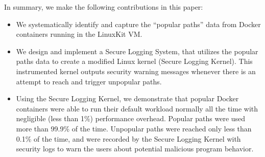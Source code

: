 In summary, we make the following contributions in this paper: 
\begin{itemize}
	\item We systematically identify and capture the ``popular paths'' data from Docker containers running in the LinuxKit VM. 
	\item We design and implement a Secure Logging System, that utilizes the popular paths data to create a modified Linux kernel (Secure Logging Kernel). This instrumented kernel outputs security warning messages whenever there is an attempt to reach and trigger unpopular paths. 
	\item Using the Secure Logging Kernel, we demonstrate that popular Docker containers were able to run their default workload normally all the time with negligible (less than 1\%) performance overhead. Popular paths were used more than 99.9\% of the time. Unpopular paths were reached only less than 0.1\% of the time, and were recorded by the Secure Logging Kernel with security logs to warn the users about potential malicious program behavior. 
\end{itemize}